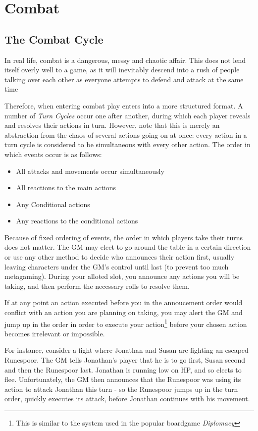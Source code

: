 
\chapter{Combat}

\section{The Combat Cycle}

In real life, combat is a dangerous, messy and chaotic affair. This does not lend itself overly well to a game, as it will inevitably descend into a rush of people talking over each other as everyone attempts to defend and attack at the same time 

Therefore, when entering combat play enters into a more structured format. A number of {\it Turn Cycles} occur one after another, during which each player reveals and resolves their actions in turn. However, note that this is merely an abstraction from the chaos of several actions going on at once: every action in a turn cycle is considered to be simultaneous with every other action. The order in which events occur is as follows:

\begin{itemize}
	\item All attacks and movements occur simultaneously
	\item All reactions to the main actions
	\item Any Conditional actions 
	\item Any reactions to the conditional actions
\end{itemize}

Because of fixed ordering of events, the order in which players take their turns does not matter. The GM may elect to go around the table in a certain direction or use any other method to decide who announces their action first, usually leaving characters under the GM's control until last (to prevent too much metagaming). During your alloted slot, you announce any actions you will be taking, and then perform the necessary rolls to resolve them.

If at any point an action executed before you in the annoucement order would conflict with an action you are planning on taking, you may alert the GM and jump up in the order in order to execute your action\footnote{This is similar to the system used in the popular boardgame {\it Diplomacy} } before your chosen action becomes irrelevant or impossible. 

For instance, consider a fight where Jonathan and Susan are fighting an escaped Runespoor. The GM tells Jonathan's player that he is to go first, Susan second and then the Runespoor last. Jonathan is running low on HP, and so elects to flee. Unfortunately, the GM then announces that the Runespoor was using its action to attack Jonathan this turn - so the Runespoor jumps up in the turn order, quickly executes its attack, before Jonathan continues with his movement. 

